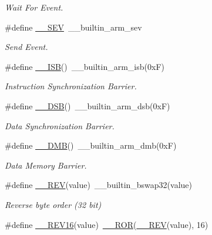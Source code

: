 \begin{DoxyCompactItemize}
\begin{DoxyCompactList}\small\item\em Wait For Event. \end{DoxyCompactList}\item 
\#define \mbox{\hyperlink{group___c_m_s_i_s___core___instruction_interface_gaab4f296d0022b4b10dc0976eb22052f9}{\+\_\+\+\_\+\+S\+EV}}~\+\_\+\+\_\+builtin\+\_\+arm\+\_\+sev
\begin{DoxyCompactList}\small\item\em Send Event. \end{DoxyCompactList}\item 
\#define \mbox{\hyperlink{group___c_m_s_i_s___core___instruction_interface_gaad233022e850a009fc6f7602be1182f6}{\+\_\+\+\_\+\+I\+SB}}()~\+\_\+\+\_\+builtin\+\_\+arm\+\_\+isb(0x\+F)
\begin{DoxyCompactList}\small\item\em Instruction Synchronization Barrier. \end{DoxyCompactList}\item 
\#define \mbox{\hyperlink{group___c_m_s_i_s___core___instruction_interface_ga067d257a2b34565410acefb5afef2203}{\+\_\+\+\_\+\+D\+SB}}()~\+\_\+\+\_\+builtin\+\_\+arm\+\_\+dsb(0x\+F)
\begin{DoxyCompactList}\small\item\em Data Synchronization Barrier. \end{DoxyCompactList}\item 
\#define \mbox{\hyperlink{group___c_m_s_i_s___core___instruction_interface_ga671101179b5943990785f36f8c1e2269}{\+\_\+\+\_\+\+D\+MB}}()~\+\_\+\+\_\+builtin\+\_\+arm\+\_\+dmb(0x\+F)
\begin{DoxyCompactList}\small\item\em Data Memory Barrier. \end{DoxyCompactList}\item 
\#define \mbox{\hyperlink{group___c_m_s_i_s___core___instruction_interface_gaca25a02e09983da5558f5242f2f635bc}{\+\_\+\+\_\+\+R\+EV}}(value)~\+\_\+\+\_\+builtin\+\_\+bswap32(value)
\begin{DoxyCompactList}\small\item\em Reverse byte order (32 bit) \end{DoxyCompactList}\item 
\#define \mbox{\hyperlink{group___c_m_s_i_s___core___instruction_interface_gad35497777af37e7809271b5e6f9510ba}{\+\_\+\+\_\+\+R\+E\+V16}}(value)~\mbox{\hyperlink{group___c_m_s_i_s___core___instruction_interface_gab16acb6456176f1e87a4f2724c2b6028}{\+\_\+\+\_\+\+R\+OR}}(\mbox{\hyperlink{group___c_m_s_i_s___core___instruction_interface_gadb92679719950635fba8b1b954072695}{\+\_\+\+\_\+\+R\+EV}}(value), 16)

\end{DoxyCompactItemize}
